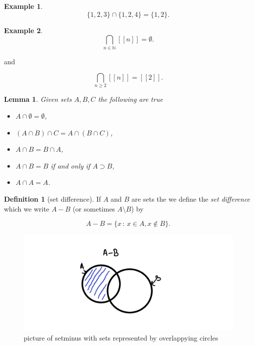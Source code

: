 \documentclass[
]{book}
\newtheorem{lemma}{Lemma}[chapter]
\theoremstyle{definition}
\newtheorem{definition}{Definition}[chapter]
\theoremstyle{definition}
\newtheorem{example}{Example}[chapter]
\theoremstyle{definition}
\theoremstyle{definition}
\theoremstyle{remark}
\begin{document}
\begin{example}
\[ \{1,2,3\} \cap \{ 1,2,4\} = \{1,2\}.\]
\end{example}

\begin{example}
\[\bigcap_{n \in \mathbb{N}} [[n]] = \emptyset. \]

and

\[ \bigcap_{n \geq 2} [[n]] = [[2]].\]
\end{example}

\begin{lemma}

Given sets \(A, B, C\) the following are true

\begin{itemize}
\item
  \(A \cap \emptyset = \emptyset\),
\item
  \((A \cap B) \cap C = A \cap (B\cap C)\),
\item
  \(A \cap B = B \cap A\),
\item
  \(A \cap B = B\) if and only if \(A \supset B\),
\item
  \(A \cap A = A\).
\end{itemize}

\end{lemma}

\begin{definition}[set difference]

If \(A\) and \(B\) are sets the we define the \emph{set difference} which we write \(A - B\) (or sometimes \(A \setminus B\)) by

\[ A - B = \{ x \,:\, x \in A, x \notin B\}.  \]

\begin{figure}
\centering
\includegraphics{setminus.png}
\caption{\label{fig:unnamed-chunk-12}picture of setminus with sets represented by overlappying circles}
\end{figure}

\end{definition}
\end{document}
